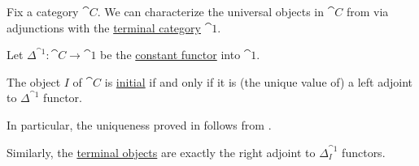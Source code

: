 \begin{proposition}\label{thm:universal_objects_as_adjunctions}
  Fix a category \( \cat{C} \). We can characterize the universal objects in \( \cat{C} \) from  via adjunctions with the \hyperref[def:universal_categories]{terminal category} \( \cat{1} \).

  Let \( \Delta^{\cat{1}}: \cat{C} \to \cat{1} \) be the \hyperref[def:diagonal_functor]{constant functor} into \( \cat{1} \).

  \begin{thmenum}
     The object \( I \) of \( \cat{C} \) is \hyperref[def:universal_objects]{initial} if and only if it is (the unique value of) a left adjoint to \( \Delta^{\cat{1}} \) functor.

    In particular, the uniqueness proved in  follows from .

     Similarly, the \hyperref[def:universal_objects]{terminal objects} are exactly the right adjoint to \( \Delta_I^{\cat{1}} \) functors.
  \end{thmenum}
\end{proposition}
